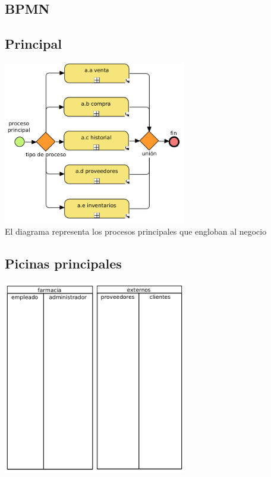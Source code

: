 \newpage
\begin{flushleft}
	\section{BPMN}
	
	\subsection{Principal}
	\begin{center}

		\includegraphics[width=8cm]{proceso/images/a.main.png}\\	

		\normalsize{El diagrama representa los procesos principales que engloban al negocio}
	\end{center}
	

	\subsection{Picinas principales}
	 
	\begin{center}
	
	\includegraphics[width=8cm]{proceso/images/a.pools.png}\\	
	

\end{center}
\end{flushleft}
